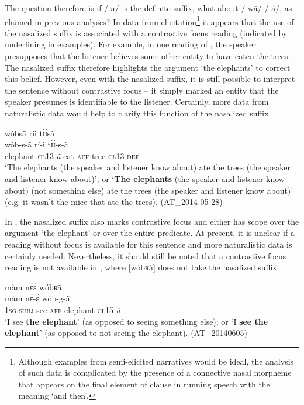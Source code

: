 \documentclass[output=paper]{langsci/langscibook}
\begin{document}
The question therefore is if /-a/ is the definite suffix, what about /-wã/ {\Tilde} /-ã/, as claimed in previous analyses? In data from elicitation\footnote{Although examples from semi-elicited narratives would be ideal, the analysis of such data is complicated by the presence of a connective nasal morpheme that appears on the final element of clause in running speech with the meaning ‘and then’.} it appears that the use of the nasalized suffix is associated with a contrastive focus reading (indicated by underlining in examples). For example, in one reading of , the speaker presupposes that the listener believes some other entity to have eaten the trees. The nasalized suffix therefore highlights the argument ‘the elephants’ to correct this belief. However, even with the nasalized suffix, it is still possible to interpret the sentence without contrastive focus – it simply marked an entity that the speaker presumes is identifiable to the listener. Certainly, more data from naturalistic data would help to clarify this function of the nasalized suffix.

\ea\label{ex:teo:45}
\glll wóbsã{\rmfnm} ríì t\'ɪ\`ɪsà\\
 wób-s-ã rí-ì t\'ɪ\`ɪ-s-à\\
elephant-\textsc{cl13-}\textit{ã} eat-\textsc{aff} tree-\textsc{cl13-def}\\
\glt ‘The elephants (the speaker and listener know about) ate the trees (the speaker and listener know about)’; or ‘\textbf{The elephants} (the speaker and listener know about) (not something else) ate the trees (the speaker and listener know about)’ (e.g. it wasn’t the mice that ate the trees). (AT\_2014-05-28)
\z
{}

In , the nasalized suffix also marks contrastive focus and either has scope over the argument ‘the elephant’ or over the entire predicate. At present, it is unclear if a reading without focus is available for this sentence and more naturalistic data is certainly needed. Nevertheless, it should still be noted that a contrastive focus reading is not available in , where [wóbʁà] does not take the nasalized suffix.


\ea\label{ex:teo:46}
\glll màm n\'ɛ\`ɛ wóbʁã\\
 màm n\'ɛ-\`ɛ wób-g-ã\\
\textsc{1sg.subj} see-\textsc{aff} elephant-\textsc{cl15}-\textit{ã}\\
\glt ‘I see \textbf{the elephant}’ (as opposed to seeing something else); or ‘I \textbf{see the elephant}’ (as opposed to not seeing the elephant). (AT\_20140605)
\z
\end{document}
